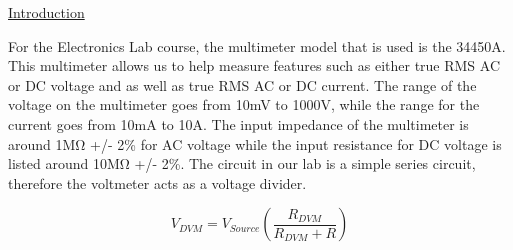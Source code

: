 \documentclass[a4paper,10pt]{article}
\begin{document}
	
\underline{Introduction}

For the Electronics Lab course, the multimeter model that is used is the 34450A. This multimeter allows us to help measure features such as either true RMS AC or DC voltage and as well as true RMS AC or DC current. The range of the voltage on the multimeter goes from 10mV to 1000V, while the range for the current goes from 10mA to 10A. The input impedance of the multimeter is around 1M\si{\ohm} +/- 2\% for AC voltage while the input resistance for DC voltage is listed around 10M\si{\ohm} +/- 2\%. The circuit in our lab is a simple series circuit, therefore the voltmeter acts as a voltage divider.

\begin{equation}
	\label{eq:vdvm}
	V_{DVM} = V_{Source}(\frac{R_{DVM}}{R_{DVM} + R}) 
\end{equation}
\end{document}
